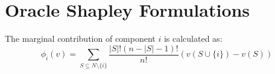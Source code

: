 \documentclass{article}
\begin{document}
\section{Oracle Shapley Formulations}
The marginal contribution of component $i$ is calculated as:
\begin{equation}
\phi_i(v) = \sum_{S \subseteq N \setminus \{i\}} \frac{|S|! (n - |S| - 1)!}{n!} (v(S \cup \{i\}) - v(S))
\end{equation}
\end{document}
